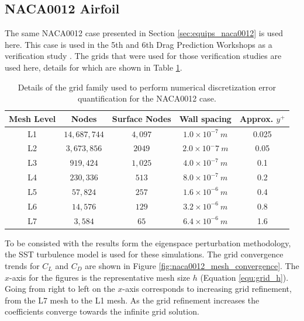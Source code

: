 \subsection{NACA0012 Airfoil} \label{sec:num_err_naca0012}

The same NACA0012 case presented in Section \ref{sec:equips_naca0012} is used here. 
This case is used in the 5th and 6th Drag Prediction Workshops as a verification study \cite{levy2013summary,roy2017summary}.
The grids that were used for those verification studies are used here, details for which are shown in Table \ref{tab:naca0012_meshes}.

\begin{table}
    \renewcommand{\arraystretch}{1.2}
    \centering
    \begin{tabular}{ c|c|c|c|c } 
         Mesh Level & Nodes & Surface Nodes & Wall spacing & Approx. $y^+$  \\ 
         \hline
         L1 & $14,687,744$ & $4,097$ & $1.0\times10^{-7}~m$ & 0.025\\
         L2 & $3,673,856$ & $2049$ & $2.0\times10^-7~m$ & 0.05\\
         L3 & $919,424$ & $1,025$ & $4.0\times10^{-7}~m$ & 0.1\\
         L4 & $230,336$ & $513$ & $8.0\times10^{-7}~m$ & 0.2\\
         L5 & $57,824$ & $257$ & $1.6\times10^{-6}~m$ & 0.4\\
         L6 & $14,576$ & $129$ & $3.2\times10^{-6}~m$ & 0.8\\
         L7 & $3,584$ & $65$ & $6.4\times10^{-6}~m$ & 1.6\\
        
    \end{tabular}
    \caption{Details of the grid family used to perform numerical discretization error quantification for the NACA0012 case.}
    \label{tab:naca0012_meshes}
\end{table}

To be consisted with the results form the eigenspace perturbation methodology, the SST turbulence model is used for these simulations. 
The grid convergence trends for $C_L$ and $C_D$ are shown in Figure \ref{fig:naca0012_mesh_convergence}.
The $x$-axis for the figures is the representative mesh size $h$ (Equation \ref{equ:grid_h}). 
Going from right to left on the $x$-axis corresponds to increasing grid refinement, from the L7 mesh to the L1 mesh. 
As the grid refinement increases the coefficients converge towards the infinite grid solution.


